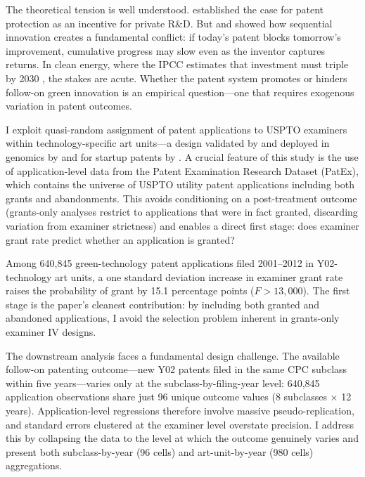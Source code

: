 \documentclass[12pt]{article}
\begin{document}
The theoretical tension is well understood. \citet{nordhaus1969} established the case for patent protection as an incentive for private R\&D. But \citet{scotchmer1991} and \citet{heller1998} showed how sequential innovation creates a fundamental conflict: if today's patent blocks tomorrow's improvement, cumulative progress may slow even as the inventor captures returns. In clean energy, where the IPCC estimates that investment must triple by 2030 \citep{ipcc2023}, the stakes are acute. Whether the patent system promotes or hinders follow-on green innovation is an empirical question---one that requires exogenous variation in patent outcomes.

I exploit quasi-random assignment of patent applications to USPTO examiners within technology-specific art units---a design validated by \citet{lemley2012} and deployed in genomics by \citet{sampat2019} and for startup patents by \citet{farremensa2020}. A crucial feature of this study is the use of application-level data from the Patent Examination Research Dataset (PatEx), which contains the universe of USPTO utility patent applications including both grants and abandonments. This avoids conditioning on a post-treatment outcome (grants-only analyses restrict to applications that were in fact granted, discarding variation from examiner strictness) and enables a direct first stage: does examiner grant rate predict whether an application is granted?

Among 640,845 green-technology patent applications filed 2001--2012 in Y02-technology art units, a one standard deviation increase in examiner grant rate raises the probability of grant by 15.1 percentage points ($F > 13{,}000$). The first stage is the paper's cleanest contribution: by including both granted and abandoned applications, I avoid the selection problem inherent in grants-only examiner IV designs.

The downstream analysis faces a fundamental design challenge. The available follow-on patenting outcome---new Y02 patents filed in the same CPC subclass within five years---varies only at the subclass-by-filing-year level: 640,845 application observations share just 96 unique outcome values (8 subclasses $\times$ 12 years). Application-level regressions therefore involve massive pseudo-replication, and standard errors clustered at the examiner level overstate precision. I address this by collapsing the data to the level at which the outcome genuinely varies and present both subclass-by-year (96 cells) and art-unit-by-year (980 cells) aggregations.
\end{document}
